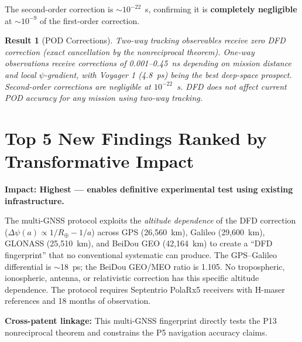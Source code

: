 \documentclass[aps,prd,twocolumn,superscriptaddress,nofootinbib]{revtex4-2}
\newcommand{\Rearth}{R_\oplus}
\newtheorem{result}{Result}
\begin{document}
The second-order correction is $\sim 10^{-22}$~s, confirming it is
\textbf{completely negligible} at $\sim 10^{-9}$ of the first-order
correction.

\begin{result}[POD Corrections]
Two-way tracking observables receive \emph{zero} DFD correction
(exact cancellation by the nonreciprocal theorem). One-way
observations receive corrections of 0.001--0.45~ns depending on
mission distance and local $\psi$-gradient, with Voyager 1
(4.8~ps) being the best deep-space prospect. Second-order
corrections are negligible at $10^{-22}$~s. DFD does not affect
current POD accuracy for any mission using two-way tracking.
\end{result}

\section{Top 5 New Findings Ranked by Transformative Impact}
\label{sec:top5}

\begin{tcolorbox}[colback=blue!5!white,colframe=blue!75!black,title=
{Finding \#1: Multi-GNSS DFD Fingerprint --- Altitude-Dependent
Discriminator}]
\textbf{Impact: Highest --- enables definitive experimental test
using existing infrastructure.}

The multi-GNSS protocol exploits the \emph{altitude dependence} of
the DFD correction ($\Delta\psi(a) \propto 1/\Rearth - 1/a$) across
GPS (26,560~km), Galileo (29,600~km), GLONASS (25,510~km), and
BeiDou GEO (42,164~km) to create a ``DFD fingerprint'' that no
conventional systematic can produce. The GPS--Galileo differential
is $\sim$18~ps; the BeiDou GEO/MEO ratio is 1.105. No tropospheric,
ionospheric, antenna, or relativistic correction has this specific
altitude dependence. The protocol requires Septentrio PolaRx5
receivers with H-maser references and 18 months of observation.

\textbf{Cross-patent linkage:} This multi-GNSS fingerprint directly
tests the P13 nonreciprocal theorem and constrains the P5
navigation accuracy claims.
\end{tcolorbox}
\end{document}
